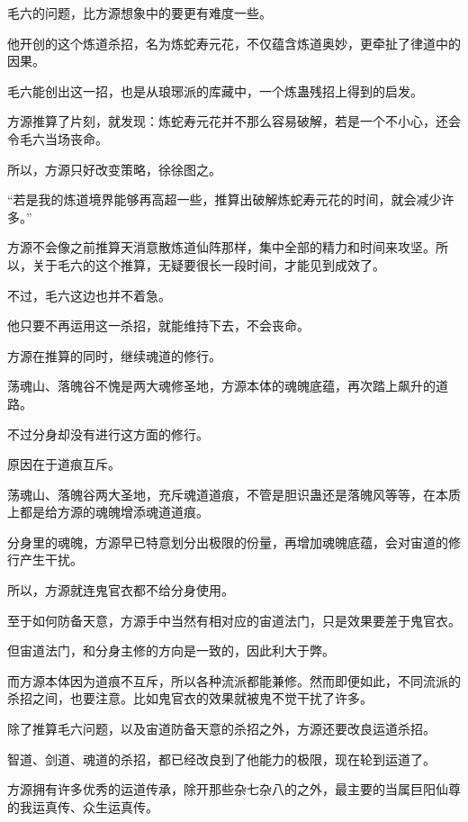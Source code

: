 
\begin{this_body}



毛六的问题，比方源想象中的要更有难度一些。

他开创的这个炼道杀招，名为炼蛇寿元花，不仅蕴含炼道奥妙，更牵扯了律道中的因果。

毛六能创出这一招，也是从琅琊派的库藏中，一个炼蛊残招上得到的启发。

方源推算了片刻，就发现：炼蛇寿元花并不那么容易破解，若是一个不小心，还会令毛六当场丧命。

所以，方源只好改变策略，徐徐图之。

“若是我的炼道境界能够再高超一些，推算出破解炼蛇寿元花的时间，就会减少许多。”

方源不会像之前推算天消意散炼道仙阵那样，集中全部的精力和时间来攻坚。所以，关于毛六的这个推算，无疑要很长一段时间，才能见到成效了。

不过，毛六这边也并不着急。

他只要不再运用这一杀招，就能维持下去，不会丧命。

方源在推算的同时，继续魂道的修行。

荡魂山、落魄谷不愧是两大魂修圣地，方源本体的魂魄底蕴，再次踏上飙升的道路。

不过分身却没有进行这方面的修行。

原因在于道痕互斥。

荡魂山、落魄谷两大圣地，充斥魂道道痕，不管是胆识蛊还是落魄风等等，在本质上都是给方源的魂魄增添魂道道痕。

分身里的魂魄，方源早已特意划分出极限的份量，再增加魂魄底蕴，会对宙道的修行产生干扰。

所以，方源就连鬼官衣都不给分身使用。

至于如何防备天意，方源手中当然有相对应的宙道法门，只是效果要差于鬼官衣。

但宙道法门，和分身主修的方向是一致的，因此利大于弊。

而方源本体因为道痕不互斥，所以各种流派都能兼修。然而即便如此，不同流派的杀招之间，也要注意。比如鬼官衣的效果就被鬼不觉干扰了许多。

除了推算毛六问题，以及宙道防备天意的杀招之外，方源还要改良运道杀招。

智道、剑道、魂道的杀招，都已经改良到了他能力的极限，现在轮到运道了。

方源拥有许多优秀的运道传承，除开那些杂七杂八的之外，最主要的当属巨阳仙尊的我运真传、众生运真传。


\end{this_body}
